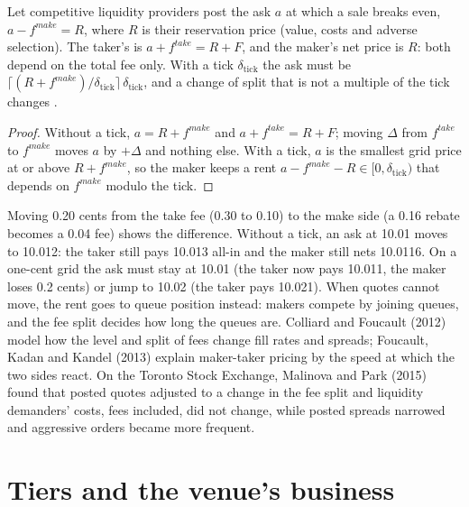 \begin{proposition}\label{prop:mx:fees-rebates-and-venue-economics:neutral}
Let competitive liquidity providers post the ask $a$ at which a sale breaks even, $a-f^{make}=R$, where $R$ is their reservation price (value, costs
and adverse selection). The taker's  is $a+f^{take}=R+F$, and the maker's net price is $R$: both depend on the total fee only. With a
tick $\delta_{\mathrm{tick}}$ the ask must be $\lceil(R+f^{make})/\delta_{\mathrm{tick}}\rceil\,\delta_{\mathrm{tick}}$, and a change of split
that is not a multiple of the tick changes .
\end{proposition}

\begin{proof}
Without a tick, $a=R+f^{make}$ and $a+f^{take}=R+F$; moving $\Delta$ from $f^{take}$ to $f^{make}$ moves $a$ by $+\Delta$ and nothing else. With a
tick, $a$ is the smallest grid price at or above $R+f^{make}$, so the maker keeps a rent $a-f^{make}-R\in[0,\delta_{\mathrm{tick}})$ that depends
on $f^{make}$ modulo the tick.
\end{proof}

Moving 0.20 cents from the take fee (0.30 to 0.10) to the make side (a 0.16 rebate becomes a 0.04 fee) shows the difference. Without a tick, an ask at
10.01 moves to 10.012: the taker still pays 10.013 all-in and the maker still nets 10.0116. On a one-cent grid the ask must stay at 10.01 (the taker now
pays 10.011, the maker loses 0.2 cents) or jump to 10.02 (the taker pays 10.021). When quotes cannot move, the rent goes to queue position instead:
makers compete by joining queues, and the fee split decides how long the queues are. Colliard and Foucault (2012) model how the level and split of fees
change fill rates and spreads; Foucault, Kadan and Kandel (2013) explain maker-taker pricing by the speed at which the two sides react. On the Toronto
Stock Exchange, Malinova and Park (2015) found that posted quotes adjusted to a change in the fee split and liquidity demanders' costs, fees included,
did not change, while posted spreads narrowed and aggressive orders became more frequent.

\section{Tiers and the venue's business}

